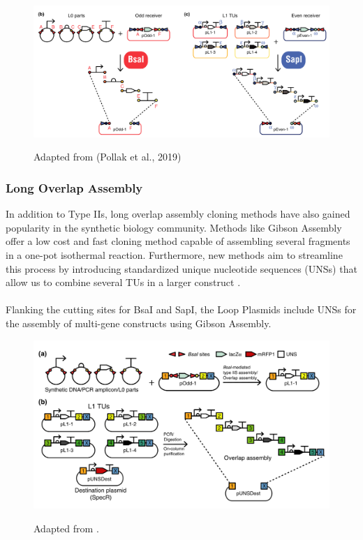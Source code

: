 \begin{figure}[!htbp]
    \centering
    \caption{Adapted from (Pollak et al., 2019)}
    \includegraphics[width=\textwidth]{images/chap4/chap4_loop_02.png}
    \label{fig:ch4loop02}
\end{figure}
\FloatBarrier

\subsubsection{Long Overlap Assembly} 
In addition to Type IIs, long overlap assembly cloning methods have also gained popularity in the synthetic biology community. Methods like Gibson Assembly \parencite{Gibson2008} offer a low cost and fast cloning method capable of assembling several fragments in a one-pot isothermal reaction. Furthermore, new methods aim to streamline this process by introducing standardized unique nucleotide sequences (UNSs) that allow us to combine several TUs in a larger construct \parencite{Pollak2020} \parencite{Torella2013}. \\ \\
Flanking the cutting sites for BsaI and SapI, the Loop Plasmids include UNSs for the assembly of multi-gene constructs using Gibson Assembly.

\begin{figure}[!htbp]
    \centering
    \caption{Adapted from \parencite{Pollak2020}.}
    \includegraphics[width=\textwidth]{images/chap4/chap4_loop_03.png}
    \label{fig:ch4loop03}
\end{figure}
\FloatBarrier


